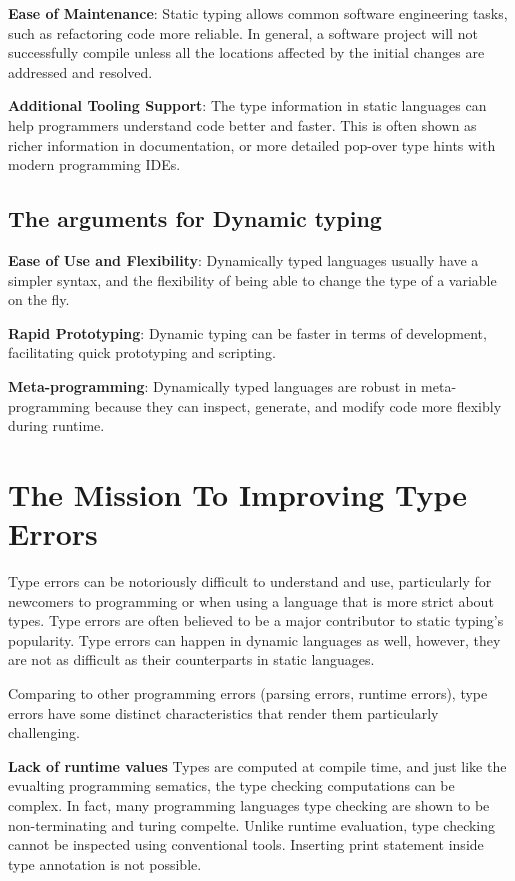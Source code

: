 \textbf{Ease of Maintenance}: Static typing allows common software engineering tasks, such as refactoring code more reliable. In general, a software project will not successfully compile unless all the locations affected by the initial changes are addressed and resolved.

\textbf{Additional Tooling Support}: The type information in static languages can help programmers understand code better and faster. This is often shown as richer information in documentation, or more detailed pop-over type hints with modern programming IDEs.  

\subsection{The arguments for Dynamic typing}

\textbf{Ease of Use and Flexibility}: Dynamically typed languages usually have a simpler syntax, and the flexibility of being able to change the type of a variable on the fly.

\textbf{Rapid Prototyping}: Dynamic typing can be faster in terms of development, facilitating quick prototyping and scripting.

\textbf{Meta-programming}: Dynamically typed languages are robust in meta-programming because they can inspect, generate, and modify code more flexibly during runtime.


\section{The Mission To Improving Type Errors}

Type errors can be notoriously difficult to understand and use, particularly for newcomers to programming or when using a language that is more strict about types. Type errors are often believed to be a major contributor to static typing's popularity. Type errors can happen in dynamic languages as well, however, they are not as difficult as their counterparts in static languages.

Comparing to other programming errors (parsing errors, runtime errors), type errors have some distinct characteristics that render them particularly challenging. 

\textbf{Lack of runtime values}
Types are computed at compile time, and just like the evualting programming sematics, the type checking computations can be complex. In fact, many programming languages type checking are shown to be non-terminating and turing compelte.  Unlike runtime evaluation, type checking cannot be inspected using conventional tools. Inserting print statement inside type annotation is not possible. 

